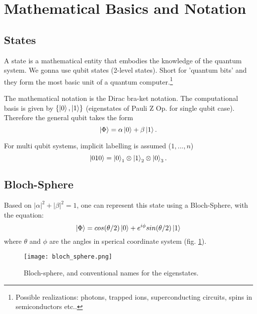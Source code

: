 \section{Mathematical Basics and Notation}


\subsection{States}\label{sec:basic.math.states}
A state is a mathematical entity that embodies the knowledge of the quantum system.
We gonna use qubit states (2-level states).
Short for 'quantum bits' and they form the most basic unit of a quantum computer.\footnote{
    Possible realizations: photons, trapped ions, superconducting circuits, 
spins in semiconductors etc..}

The mathematical notation is the Dirac bra-ket notation. 
The computational basis is given by $\{\ket{0}, \ket{1}\}$ (eigenstates of Pauli Z Op. for single qubit case).
Therefore the general qubit takes the form 
\begin{equation*}
    \ket{\Phi} = \alpha \ket{0} + \beta \ket{1}.
\end{equation*}


For multi qubit systems, implicit labelling is assumed ($1,...,n$)
\begin{equation*}
    \ket{010} = \ket{0}_1 \otimes \ket{1}_2 \otimes \ket{0}_3.
\end{equation*}


\subsection{Bloch-Sphere}\label{sec:basic.math.bloch_sphere}
Based on $|\alpha|^2 + |\beta|^2=1$, one can represent this state using a Bloch-Sphere, with the equation:
\begin{equation*}
    \ket{\Phi} = cos(\theta /2) \ket{0} + e^{i\phi} sin(\theta/2) \ket{1}
\end{equation*}
where $\theta$ and $\phi$ are the angles in sperical coordinate system (fig. \ref{fig:bloch_sphere}). 

\begin{figure}[h]
    \begin{center}
        \texttt{[image: bloch\_sphere.png]}
    \end{center}
    \caption{Bloch-sphere, and conventional names for the eigenstates. }
    \label{fig:bloch_sphere}
\end{figure}

